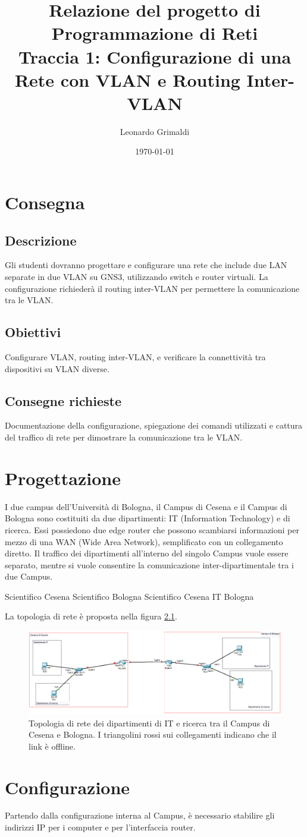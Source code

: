 \documentclass[a4paper,12pt]{report}
\title{Relazione del progetto di Programmazione di Reti 
    \\ Traccia 1: Configurazione di una Rete con VLAN e Routing Inter-VLAN}
\author{Leonardo Grimaldi}
\date{\today}
\newcommand{\myexample}[2]{
    \begin{tcolorbox}[colback=black!5!white,colframe=black,title={Esempio: #1}]
        #2
    \end{tcolorbox}
}
\begin{document}
\maketitle
\tableofcontents
\chapter{Consegna}
\section{Descrizione}
Gli studenti dovranno progettare e configurare una rete che include due LAN separate in due VLAN su GNS3, utilizzando switch e router virtuali. La configurazione richiederà il routing inter-VLAN per permettere la comunicazione tra le VLAN.
\section{Obiettivi}
Configurare VLAN, routing inter-VLAN, e verificare la connettività tra dispositivi su VLAN diverse.
\section{Consegne richieste}
Documentazione della configurazione, spiegazione dei comandi utilizzati e cattura del traffico di rete per dimostrare la comunicazione tra le VLAN.
\chapter{Progettazione}
I due campus dell'Università di Bologna, il Campus di Cesena e il Campus di Bologna sono costituiti da due dipartimenti: IT (Information Technology) e di ricerca.
%
Essi possiedono due edge router che possono scambiarsi informazioni per mezzo di una WAN (Wide Area Network), semplificato con un collegamento diretto.
%
Il traffico dei dipartimenti all'interno del singolo Campus vuole essere separato, mentre si vuole consentire la comunicazione inter-dipartimentale tra i due Campus.
%
\myexample{Ping tra i Campus}{
    Scientifico Cesena Scientifico Bologna
    Scientifico Cesena  IT Bologna
}
La topologia di rete è proposta nella figura \ref{fig:topologia_offline}. 
\begin{figure}
\includegraphics[width=\textwidth]{offline_topology_with_departments.png}
\caption{
    Topologia di rete dei dipartimenti di IT e ricerca tra il Campus di Cesena e Bologna.
    I triangolini rossi sui collegamenti indicano che il link è offline.
    }
\label{fig:topologia_offline}
\end{figure}
\chapter{Configurazione}
Partendo dalla configurazione interna al Campus, è necessario stabilire gli indirizzi IP per i computer e per l'interfaccia router.
\end{document}
